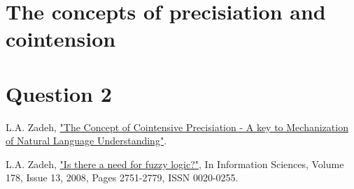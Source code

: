 \documentclass[11pt]{article}
\begin{document}
\section*{The concepts of precisiation and cointension}



\section*{Question 2}


\begin{thebibliography}{9}

    L.A. Zadeh,
    \href{http://www.math.s.chiba-u.ac.jp/~yasuda/open2all/Paris06/IPMU2006/HTML/FINALPAPERS/P703.PDF}{"The Concept of Cointensive Precisiation - A key to Mechanization of Natural Language Understanding"}.

    L.A. Zadeh,
    \href{http://www.sciencedirect.com/science/article/pii/S0020025508000716}{"Is there a need for fuzzy logic?"}, In Information Sciences, Volume 178, Issue 13, 2008, Pages 2751-2779, ISSN 0020-0255.

\end{thebibliography}
\end{document}

